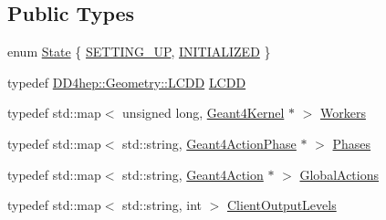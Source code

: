\subsection*{Public Types}
\begin{DoxyCompactItemize}
\item 
enum \hyperlink{class_d_d4hep_1_1_simulation_1_1_geant4_kernel_ab0de90f94bc8898e60c2ca6cef292d92}{State} \{ \hyperlink{class_d_d4hep_1_1_simulation_1_1_geant4_kernel_ab0de90f94bc8898e60c2ca6cef292d92ad9e96c644ab9e3980c3c72ffb02cdefc}{SETTING\_\-UP}, 
\hyperlink{class_d_d4hep_1_1_simulation_1_1_geant4_kernel_ab0de90f94bc8898e60c2ca6cef292d92a0d9e793dd29116f95a10525a25f9701a}{INITIALIZED}
 \}
\item 
typedef \hyperlink{class_d_d4hep_1_1_geometry_1_1_l_c_d_d}{DD4hep::Geometry::LCDD} \hyperlink{class_d_d4hep_1_1_simulation_1_1_geant4_kernel_a190e652b62ebce3db3372c4265ffa5a3}{LCDD}
\item 
typedef std::map$<$ unsigned long, \hyperlink{class_d_d4hep_1_1_simulation_1_1_geant4_kernel}{Geant4Kernel} $\ast$ $>$ \hyperlink{class_d_d4hep_1_1_simulation_1_1_geant4_kernel_ae9fdf26cda88a6f822f060558e85d797}{Workers}
\item 
typedef std::map$<$ std::string, \hyperlink{class_d_d4hep_1_1_simulation_1_1_geant4_action_phase}{Geant4ActionPhase} $\ast$ $>$ \hyperlink{class_d_d4hep_1_1_simulation_1_1_geant4_kernel_ae28985781d4226ece4c3fffe8827b400}{Phases}
\item 
typedef std::map$<$ std::string, \hyperlink{class_d_d4hep_1_1_simulation_1_1_geant4_action}{Geant4Action} $\ast$ $>$ \hyperlink{class_d_d4hep_1_1_simulation_1_1_geant4_kernel_a9cd070dfd06f049aa11b56688faaa643}{GlobalActions}
\item 
typedef std::map$<$ std::string, int $>$ \hyperlink{class_d_d4hep_1_1_simulation_1_1_geant4_kernel_a259066f5e9a56bdbfc9718a2b42b8b06}{ClientOutputLevels}
\end{DoxyCompactItemize}
